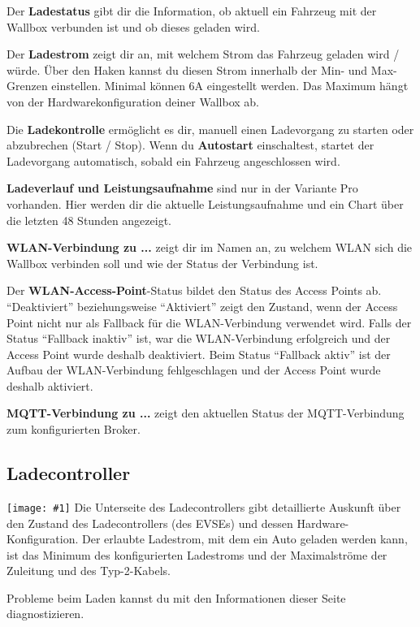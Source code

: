 \documentclass[a4paper,10pt]{article}
\newcommand{\gfx}[1]{\texttt{[image: \#1]}}
\begin{document}
\begin{multicols*}{2}
	Der \textbf{Ladestatus} gibt dir die Information, ob aktuell ein
	Fahrzeug mit der Wallbox verbunden ist und ob dieses geladen wird.

	Der \textbf{Ladestrom} zeigt dir an, mit welchem Strom das Fahrzeug geladen
	wird / würde. Über den Haken kannst du diesen Strom innerhalb der Min-
	und Max-Grenzen einstellen. Minimal können 6A eingestellt werden. Das
	Maximum hängt von der Hardwarekonfiguration deiner Wallbox ab.

	Die \textbf{Ladekontrolle} ermöglicht es dir, manuell einen Ladevorgang zu
	starten oder abzubrechen (Start / Stop). Wenn du \textbf{Autostart}
	einschaltest, startet der Ladevorgang automatisch, sobald ein Fahrzeug
	angeschlossen wird.

	\textbf{Ladeverlauf und Leistungsaufnahme} sind nur in der Variante Pro
	vorhanden. Hier werden dir die aktuelle Leistungsaufnahme und ein Chart über
	die letzten 48 Stunden angezeigt.

	\textbf{WLAN-Verbindung zu ...} zeigt dir im Namen an, zu welchem WLAN
	sich die Wallbox verbinden soll und wie der Status der Verbindung ist.

	Der \textbf{WLAN-Access-Point}-Status bildet den Status des Access Points ab.
	\enquote{Deaktiviert} beziehungsweise \enquote{Aktiviert} zeigt den Zustand, wenn der Access Point nicht
	nur als Fallback für die WLAN-Verbindung verwendet wird. Falls der Status \enquote{Fallback inaktiv} ist,
	war die WLAN-Verbindung erfolgreich und der Access Point wurde deshalb deaktiviert.
	Beim Status \enquote{Fallback aktiv} ist der Aufbau der WLAN-Verbindung fehlgeschlagen und der
	Access Point wurde deshalb aktiviert.

	\textbf{MQTT-Verbindung zu ...} zeigt den aktuellen Status der MQTT-Verbindung
	zum konfigurierten Broker.

	\subsection{Ladecontroller}
	\gfx{./img_warp2/resized/web_evse}
	Die Unterseite des Ladecontrollers gibt detaillierte Auskunft über den Zustand
	des Ladecontrollers (des EVSEs) und dessen Hardware-Konfiguration. Der
	erlaubte Ladestrom, mit dem ein Auto geladen werden kann, ist das Minimum des
	konfigurierten Ladestroms und der Maximalströme der Zuleitung und des Typ-2-Kabels.

	Probleme beim Laden kannst du mit den Informationen dieser
	Seite diagnostizieren.


\end{multicols*}
\end{document}
